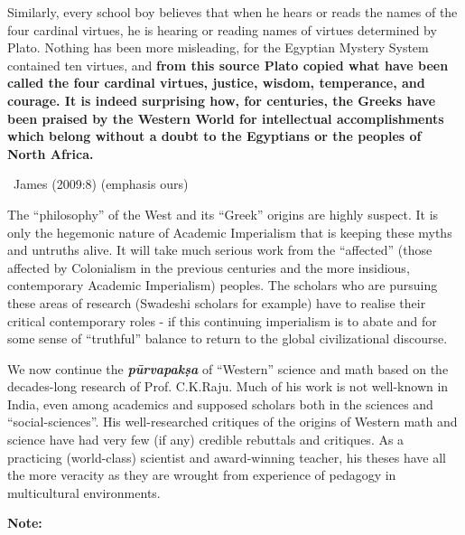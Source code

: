 \begin{myquote}
Similarly, every school boy believes that when he hears or reads the names of the four cardinal virtues, he is hearing or reading names of virtues determined by Plato. Nothing has been more misleading, for the Egyptian Mystery System contained ten virtues, and \textbf{from this source Plato copied what have been called the four cardinal virtues, justice, wisdom, temperance, and courage. It is indeed surprising how, for centuries, the Greeks have been praised by the Western World for intellectual accomplishments which belong without a doubt to the Egyptians or the peoples of North Africa.}

~\hfill James (2009:8) (emphasis ours)
\end{myquote}

The “philosophy” of the West and its “Greek” origins are highly suspect. It is only the hegemonic nature of Academic Imperialism that is keeping these myths and untruths alive. It will take much serious work from the “affected” (those affected by Colonialism in the previous centuries and the more insidious, contemporary Academic Imperialism) peoples. The scholars who are pursuing these areas of research (Swadeshi scholars for example) have to realise their critical contemporary roles - if this continuing imperialism is to abate and for some sense of “truthful” balance to return to the global civilizational discourse.

\vskip 3pt

We now continue the \textbf{\textit{pūrvapakṣa}} of “Western” science and math based on the decades-long research of Prof. C.K.Raju. Much of his work is not well-known in India, even among academics and supposed scholars both in the sciences and “social-sciences”. His well-researched critiques of the origins of Western math and science have had very few (if any) credible rebuttals and critiques. As a practicing (world-class) scientist and award-winning teacher, his theses have all the more veracity as they are wrought from experience of pedagogy in multicultural environments.

\vskip 4pt

\textbf{Note:}

\vskip 4pt

